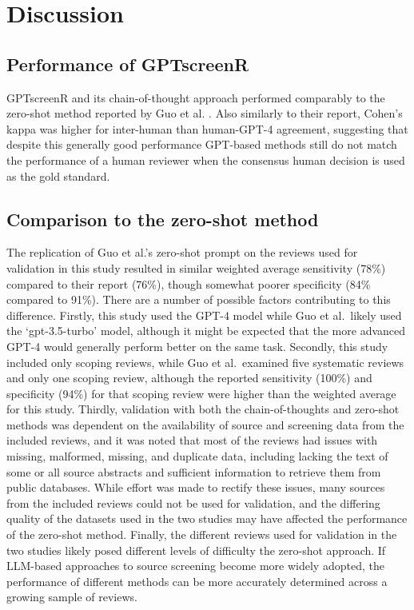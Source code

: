 \documentclass[10pt,a4paper,twocolumn]{article}
\begin{document}
\section{Discussion}

\subsection{Performance of GPTscreenR}

GPTscreenR and its chain-of-thought approach performed comparably to the zero-shot method reported by Guo et al. \cite{Guo.2023}. Also similarly to their report, Cohen's kappa was higher for inter-human than human-GPT-4 agreement, suggesting that despite this generally good performance GPT-based methods still do not match the performance of a human reviewer when the consensus human decision is used as the gold standard.

\subsection{Comparison to the zero-shot method}

The replication of Guo et al.'s zero-shot prompt on the reviews used for validation in this study resulted in similar weighted average sensitivity (78\%) compared to their report (76\%), though somewhat poorer specificity (84\% compared to 91\%). There are a number of possible factors contributing to this difference. Firstly, this study used the GPT-4 model while Guo et al.~likely used the `gpt-3.5-turbo' model, although it might be expected that the more advanced GPT-4 would generally perform better on the same task. Secondly, this study included only scoping reviews, while Guo et al.~examined five systematic reviews and only one scoping review, although the reported sensitivity (100\%) and specificity (94\%) for that scoping review were higher than the weighted average for this study. Thirdly, validation with both the chain-of-thoughts and zero-shot methods was dependent on the availability of source and screening data from the included reviews, and it was noted that most of the reviews had issues with missing, malformed, missing, and duplicate data, including lacking the text of some or all source abstracts and sufficient information to retrieve them from public databases. While effort was made to rectify these issues, many sources from the included reviews could not be used for validation, and the differing quality of the datasets used in the two studies may have affected the performance of the zero-shot method. Finally, the different reviews used for validation in the two studies likely posed different levels of difficulty the zero-shot approach. If LLM-based approaches to source screening become more widely adopted, the performance of different methods can be more accurately determined across a growing sample of reviews.
\end{document}
